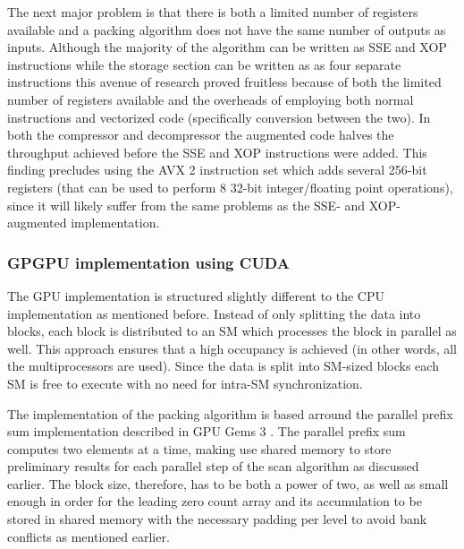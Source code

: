   The next major problem is that there is both a limited number of registers available and a packing algorithm does not have the same number of outputs as inputs. Although
  the majority of the algorithm can be written as SSE and XOP instructions while the storage section can be written as as four separate instructions this avenue of research
  proved fruitless because of both the limited number of registers available and the overheads of employing both normal instructions and vectorized code (specifically conversion
  between the two). In both the compressor and decompressor the augmented code halves the throughput achieved before the SSE and XOP instructions were added. This finding precludes
  using the AVX 2 instruction set which adds several 256-bit registers (that can be used to perform 8 32-bit integer/floating point operations), since it will likely suffer from
  the same problems as the SSE- and XOP-augmented implementation.
  \subsubsection{GPGPU implementation using CUDA}
  The GPU implementation is structured slightly different to the CPU implementation as mentioned before. Instead of only splitting the data into blocks, each block is distributed to
  an SM which processes the block in parallel as well. This approach ensures that a high occupancy is achieved (in other words, all the multiprocessors are used). Since the data is
  split into SM-sized blocks each SM is free to execute with no need for intra-SM synchronization. 
  
  The implementation of the packing algorithm is based arround the parallel prefix sum implementation described in GPU Gems 3 \cite{harris2007parallel}. The parallel prefix sum computes two 
  elements at a time, making use shared memory to store preliminary results for each parallel step of the scan algorithm as discussed earlier. The block size, therefore, has to be both a power of 
  two, as well as small enough in order for the leading zero count array and its accumulation to be stored in shared memory with the necessary padding per level to avoid bank conflicts as mentioned 
  earlier.
  
